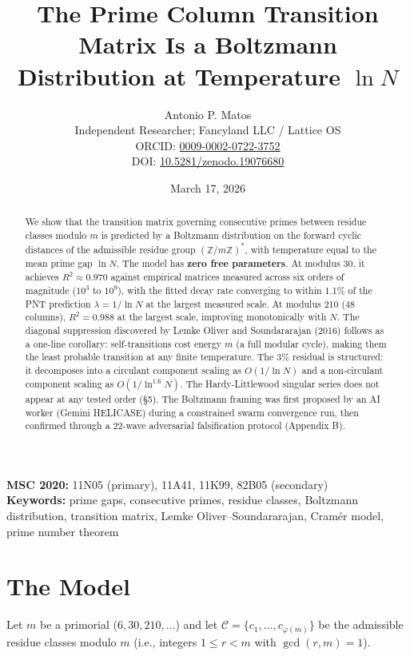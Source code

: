 \documentclass[
  11pt,
]{article}
\title{The Prime Column Transition Matrix Is a Boltzmann Distribution at Temperature $\ln N$}
\author{Antonio P. Matos\\\small Independent Researcher; Fancyland LLC / Lattice OS\\\small ORCID: \href{https://orcid.org/0009-0002-0722-3752}{0009-0002-0722-3752}\\\small DOI: \href{https://doi.org/10.5281/zenodo.19076680}{10.5281/zenodo.19076680}}
\date{March 17, 2026}
\begin{document}
\maketitle

\noindent\textbf{MSC 2020:} 11N05 (primary), 11A41, 11K99, 82B05 (secondary)\\
\textbf{Keywords:} prime gaps, consecutive primes, residue classes,
Boltzmann distribution, transition matrix, Lemke Oliver--Soundararajan,
Cram\'er model, prime number theorem

\begin{abstract}

We show that the transition matrix governing consecutive primes between
residue classes modulo \(m\) is predicted by a Boltzmann distribution on
the forward cyclic distances of the admissible residue group
\((\mathbb{Z}/m\mathbb{Z})^*\), with temperature equal to the mean prime
gap \(\ln N\). The model has \textbf{zero free parameters}. At modulus
30, it achieves \(R^2 \approx 0.970\) against empirical matrices
measured across six orders of magnitude (\(10^3\) to \(10^9\)), with the
fitted decay rate converging to within 1.1\% of the PNT prediction
\(\lambda = 1/\ln N\) at the largest measured scale. At modulus 210 (48
columns), \(R^2 = 0.988\) at the largest scale, improving monotonically
with \(N\). The diagonal suppression discovered by Lemke Oliver and
Soundararajan (2016) follows as a one-line corollary: self-transitions
cost energy \(m\) (a full modular cycle), making them the least probable
transition at any finite temperature. The 3\% residual is structured: it
decomposes into a circulant component scaling as \(O(1/\ln N)\) and a
non-circulant component scaling as \(O(1/\ln^{1.6} N)\). The
Hardy-Littlewood singular series does not appear at any tested order
(§5). The Boltzmann framing was first proposed by an AI worker (Gemini
HELICASE) during a constrained swarm convergence run, then confirmed
through a 22-wave adversarial falsification protocol (Appendix B).
\end{abstract}

\section{The Model}\label{sec:model}

Let \(m\) be a primorial (\(6, 30, 210, \ldots\)) and let
\(\mathcal{C} = \{c_1, \ldots, c_{\varphi(m)}\}\) be the admissible
residue classes modulo \(m\) (i.e., integers \(1 \leq r < m\) with
\(\gcd(r, m) = 1\)).
\end{document}
